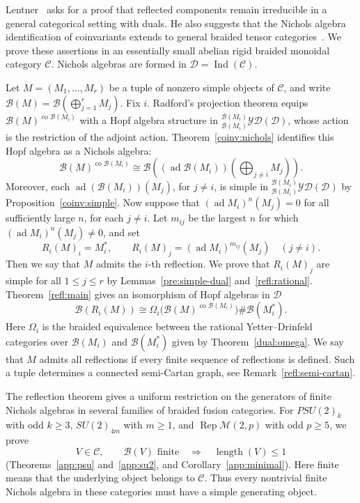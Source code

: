 \documentclass[11pt, a4paper]{article}
\numberwithin{equation}{section}
\newcommand{\C}{\mathcal C}
\newcommand{\D}{\mathcal D}
\newcommand{\B}{\mathcal B}
\newcommand{\YD}{\mathcal{YD}}
\DeclareMathOperator{\ad}{ad}
\DeclareMathOperator{\co}{co}
\DeclareMathOperator{\Ind}{Ind}
\begin{document}
Lentner~\cite[Problem~4, p.~28]{Lentner26} asks for a proof that reflected
components remain irreducible in a general categorical setting with
duals. He also suggests that the Nichols algebra identification of
coinvariants extends to general braided tensor
categories~\cite[Remark~5.2.2, p.~64]{Lentner26}.
We prove these assertions in an essentially small abelian rigid braided
monoidal category $\C$. Nichols algebras are formed in
$\D=\Ind(\C)$.

Let $M=(M_1,\ldots,M_{ {r}})$ be a tuple of nonzero simple objects of
$\C$, and write $\B(M)=\B(\bigoplus_{ {j}=1}^{{ {r}}}M_j)$.
 {Fix $i$. Radford's projection theorem
\cite[Theorem~3.10]{Simon} equips $\B(M)^{\co\B(M_i)}$ with a
Hopf algebra structure in ${}_{\B(M_i)}^{\B(M_i)}\YD(\D)$,
whose action is the restriction of the adjoint action.
Theorem~\ref{coinv:nichols} identifies this Hopf algebra as a
Nichols algebra:}
\[
 \B(M)^{\co\B(M_i)} \cong
 \mathcal{B}((\operatorname{ad}\B(M_i))(\bigoplus_{j\neq i}M_j)).
\]
{Moreover, each $\ad(\B(M_i))(M_j)$, for $j\ne i$,
is simple in ${}_{\B(M_i)}^{\B(M_i)}\YD(\D)$
by Proposition~\ref{coinv:simple}.}
Now suppose that
$(\ad M_i)^{ {n}}(M_j)=0$ for all sufficiently large ${ {n}}$, for each $j\ne i$.
Let $m_{ij}$ be the largest ${ {n}}$ for which
$(\ad M_i)^{ {n}}(M_j)\ne0$, and set
\[
 R_i(M)_i=M_i^*,\qquad
 R_i(M)_j=(\ad M_i)^{m_{ij}}(M_j)\quad(j\ne i).
\]
 {Then we say that $M$ admits the $i$-th reflection.}
We prove that $R_i(M)_j$ are simple  for all $1\leq j \leq { {r}}$ by
Lemmas~\ref{pre:simple-dual} and~\ref{refl:rational}.
Theorem~\ref{refl:main} gives an isomorphism of Hopf algebras in $\D$
\[
 \B(R_i(M))\cong
 \Omega_i\bigl(\B(M)^{\co\B(M_i)}\bigr)\#\B(M_i^*).
\]
Here $\Omega_i$ is the braided equivalence between
the rational Yetter--Drinfeld categories over $\B(M_i)$ and
$\B(M_i^*)$ given by Theorem~\ref{dual:omega}.
 We say that $M$ admits all reflections if every finite
sequence of reflections is defined. Such a tuple determines a
connected semi-Cartan graph, see Remark~\ref{refl:semi-cartan}.
  
The reflection theorem gives a uniform restriction on the
generators of finite Nichols algebras in several families of
braided fusion categories. For $PSU(2)_k$ with odd $k\ge3$,
$SU(2)_{4m}$ with $m\ge1$, and
$\operatorname{Rep}\mathcal M(2,p)$ with odd $p\ge5$, we prove
\[
 V\in\C,\qquad \B(V)\text{ finite}
 \quad\Longrightarrow\quad \operatorname{length}(V)\le1
\]
(Theorems~\ref{app:psu} and~\ref{app:su2}, and
Corollary~\ref{app:minimal}).
Here finite means that the underlying object belongs to $\C$.
Thus every nontrivial finite Nichols algebra in these categories
must have a simple generating object.
\end{document}
